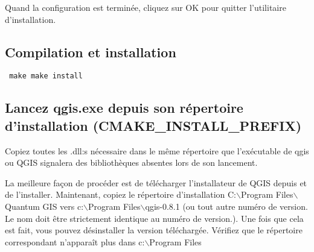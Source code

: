 Quand la configuration est terminée, cliquez sur OK pour quitter l'utilitaire d'installation.

\subsection{Compilation et installation}
\begin{verbatim}
 make make install 
\end{verbatim}

% 
% 

\subsection{Lancez qgis.exe depuis son répertoire d'installation (CMAKE\_INSTALL\_PREFIX)}
Copiez toutes les .dll:s nécessaire dans le même répertoire que l'exécutable de qgis ou QGIS signalera des bibliothèques absentes lors de son lancement.

La meilleure façon de procéder est de télécharger l'installateur de QGIS depuis  et de l'installer. Maintenant, copiez le répertoire d'installation C:$\backslash$Program Files$\backslash$Quantum GIS
vers c:$\backslash$Program Files$\backslash$qgis-0.8.1 (ou tout autre numéro de version. Le nom doit être strictement identique au numéro de version.). Une fois que cela est fait, vous pouvez désinstaller la version téléchargée. Vérifiez que le répertoire correspondant n'apparaît plus dans c:$\backslash$Program Files 

